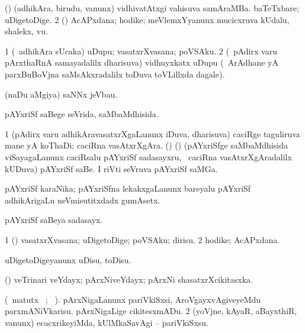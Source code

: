 {{{{\bentry
{} 
\gl{\nA}
\expl{}
\bmng
\bnum
{} (\pArxparx) 
\banum
{} (adhikAra, birudu, \mo vanunx) vidhivatAtxgi vahisuva samAraMBa. 
 baTeTxbare; uDigetoDige. 
\eanum
\numie
\num{2} (\pArxvi) AcAPxdana; hodike; meVlemxYyanunx mucicxruva kUdalu, shalekx, \mo vu. 
\enum
\emng
\eentry

\bentry
{} 
\gl{\nA}
\expl{}
\bmng
\bnum
\num{1} (\kanmu\ adhikAra sUcaka) uDupu; vasatxrXvasana; poVSAku. 
\num{2} (\kanmu\ pAdirx \mo varu pArxthaRnA samayadalilx dharisuva) vidhuyxkatx uDupu (\kanmu\ ArAdhane yA parxBuBoVjna saMsAkxradalilx toDuva toVLillxda dagale). 
\enum
\emng
\eentry

\bentry
{} 
\gl{\nA}
\expl{}
\bmng
 (naDu aMgiya) saNNx jeVbau. 
\emng
\eentry

\bentry
{} 
\gl{\gu}
\expl{}
\bmng
 pAYxriSf saBege seVrida, saMbaMdhisida. 
\emng
\eentry

\bentry
{} 
\gl{\nA}
\bmng
\bnum
\num{1} (pAdirx \mo varu adhikAravasatxrXgaLanunx iDuva, dharisuva) caciRge taguliruva mane yA koThaDi; caciRna vasAtxrXgAra. 
 (\ca) (\birx) 
\banum
{} (pAYxriSfge saMbaMdhisida viSayagaLanunx caciRsalu pAYxriSf sadasayxru, \kanmu\ caciRna vasAtxrXgAradalilx kUDuva) pAYxriSf saBe. 
 I riVti seVruva pAYxriSf saMGa. 
\eanum
\numie
\enum
\emng
\eentry

\bentry
{} 
\gl{\nA}
\expl{}
\bmng
 pAYxriSf karaNika; pAYxriSfna lekakxgaLanunx bareyalu pAYxriSf adhikArigaLu neVmisutitxdadx gumAsetx. 
\emng
\eentry

\bentry
{} 
\gl{\nA}
\bmng
 pAYxriSf saBeya sadasayx. 
\emng
\eentry

\bentry
{} 
\gl{\nA}
\expl{}
\bmng
\bnum
\num{1} (\kAparx) vasatxrXvasana; uDigetoDige; poVSAku; dirisu. 
\num{2} hodike; AcAPxdana. 
\enum
\emng
\eentry

\bentry
{} 
\gl{\sakirx}
\expl{}
\bmng
 uDigetoDigeyanunx uDisu, toDisu. 
\emng
\eentry

\bentry
{} 
\gl{\nA}
\expl{}
\bmng
 (\AmA) veTrinari veYdayx; pArxNiveYdayx; pArxNi shasatxrXcikitasxka. 
\emng
\eentry

\bentry
{} 
\gl{\sakirx}(\BU\ matutx \BUkaq\ ; \vakaq\
). \bmng
\bnum
{} 
\banum
{} pArxNigaLanunx pariVkiSxsi, AroVgayxvAgiveyeMdu parxmANiVkarisu. 
\alnum{b} pArxNigaLige cikitesxmADu. 
\eanum
\numie
\num{2} (yoVjne, kAyaR, aBayxthiR, \mo vanunx) ecacxrikeyiMda, kUlMkaSavAgi -- pariVkiSxsu. 
\enum
\emng
\eentry

}}}}
